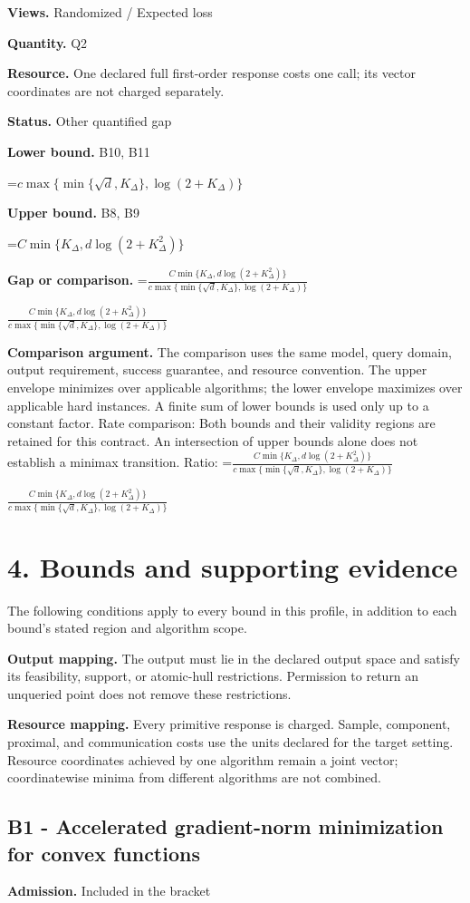 \documentclass[10pt,a4paper]{article}
\newcommand{\AtlasMath}[1]{\par\begingroup\centering\setbox0=\hbox{$\displaystyle #1$}\ifdim\wd0>1.4\linewidth\typeout{ATLAS WIDE FORMULA: \the\wd0}\fi\ifdim\wd0>\linewidth\resizebox{\linewidth}{!}{\box0}\else\box0\fi\par\endgroup}
\newcommand{\AtlasInlineMath}[1]{\begingroup\setbox0=\hbox{$#1$}\ifdim\wd0>.4\linewidth\endgroup\AtlasMath{#1}\else\endgroup$#1$\fi}
\begin{document}
\textbf{Views.} Randomized / Expected loss

\textbf{Quantity.} Q2

\textbf{Resource.} One declared full first-order response costs one call; its vector coordinates are not charged separately.

\textbf{Status.} Other quantified gap

\textbf{Lower bound.} B10, B11

\AtlasMath{c\max\{\min\{\sqrt d,K_\Delta\},\log(2+K_\Delta)\}}
\textbf{Upper bound.} B8, B9

\AtlasMath{C\min\{K_\Delta,d\log(2+K_\Delta^2)\}}
\textbf{Gap or comparison.} \AtlasInlineMath{\frac{C\min\{K_\Delta,d\log(2+K_\Delta^2)\}}{c\max\{\min\{\sqrt d,K_\Delta\},\log(2+K_\Delta)\}}}

\textbf{Comparison argument.} The comparison uses the same model, query domain, output requirement, success guarantee, and resource convention. The upper envelope minimizes over applicable algorithms; the lower envelope maximizes over applicable hard instances. A finite sum of lower bounds is used only up to a constant factor. Rate comparison: Both bounds and their validity regions are retained for this contract. An intersection of upper bounds alone does not establish a minimax transition. Ratio: \AtlasInlineMath{\frac{C\min\{K_\Delta,d\log(2+K_\Delta^2)\}}{c\max\{\min\{\sqrt d,K_\Delta\},\log(2+K_\Delta)\}}}

\section{4. Bounds and supporting evidence}
The following conditions apply to every bound in this profile, in addition to each bound's stated region and algorithm scope.

\textbf{Output mapping.} The output must lie in the declared output space and satisfy its feasibility, support, or atomic-hull restrictions. Permission to return an unqueried point does not remove these restrictions.

\textbf{Resource mapping.} Every primitive response is charged. Sample, component, proximal, and communication costs use the units declared for the target setting. Resource coordinates achieved by one algorithm remain a joint vector; coordinatewise minima from different algorithms are not combined.

\subsection{B1 - Accelerated gradient-norm minimization for convex functions}
\textbf{Admission.} Included in the bracket
\end{document}
